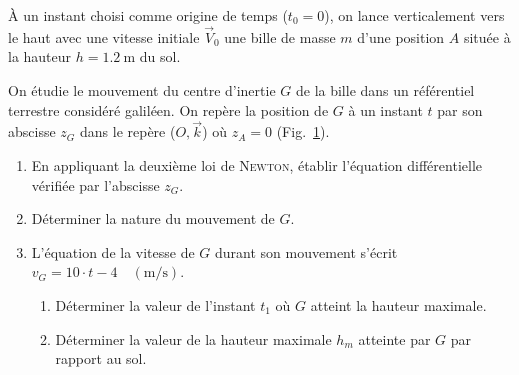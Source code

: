 \begin{minipage}[t][][t]{0.78\linewidth}
    À un instant choisi comme origine de temps ($t_{0}=0$), on lance verticalement
    vers le haut avec une vitesse initiale $\vec{V}_{0}$ une bille de masse $m$
    d'une position $A$ située à la hauteur $h=\qty{1.2}{\m}$ du sol.
    
    On étudie le mouvement du centre d'inertie $G$ de la bille dans un référentiel
    terrestre considéré galiléen. On repère la position de $G$ à un instant $t$ par
    son abscisse $z_{G}$ dans le repère ($O,\vec{k}$) où $z_{A}=0$
    (Fig.~\ref{fig:2bac_svt_national_2024_normale_phys_ex3_1}).
    
    \begin{enumerate}
        \item En appliquant la deuxième loi de \textsc{Newton}, établir l'équation
              différentielle vérifiée par l'abscisse $z_{G}$.
        \item Déterminer la nature du mouvement de $G$.
        \item L'équation de la vitesse de $G$ durant son mouvement s'écrit\\
              ${v_{G}=10\cdot t-4 \quad (\unit{\m\per\s})}$.
              \begin{enumerate}
                  \item Déterminer la valeur de l'instant $t_{1}$ où $G$ atteint la
                        hauteur maximale.
                  \item Déterminer la valeur de la hauteur maximale $h_{m}$ atteinte
                        par $G$ par rapport au sol.
              \end{enumerate}
    \end{enumerate}
\end{minipage}
\hfill
\begin{minipage}[t][][t]{0.2\linewidth}
\begin{figure}[H]
	\centering
	\caption{}
	\label{fig:2bac_svt_national_2024_normale_phys_ex3_1}
\end{figure}
\end{minipage}
